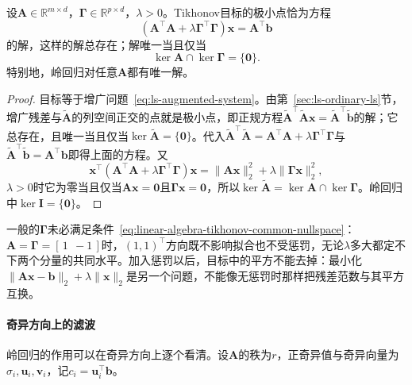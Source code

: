 \begin{theorem}[Tikhonov解的存在与唯一]
\label{thm:ls-tikhonov-existence-uniqueness}
设$\bm A\in\mathbb R^{m\times d}$，$\bm\Gamma\in\mathbb R^{p\times d}$，$\lambda>0$。Tikhonov目标的极小点恰为方程
\[
 (\bm A^\top\bm A+\lambda\bm\Gamma^\top\bm\Gamma)\bm x=\bm A^\top\bm b
\]
的解，这样的解总存在；解唯一当且仅当
\begin{equation}
 \ker\bm A\cap\ker\bm\Gamma=\{\bm0\}.
 \label{eq:linear-algebra-tikhonov-common-nullspace}
\end{equation}
特别地，岭回归对任意$\bm A$都有唯一解。
\end{theorem}
\begin{proof}
目标等于增广问题~\eqref{eq:ls-augmented-system}。由第~\ref{sec:ls-ordinary-ls}节，增广残差与$\tilde{\bm A}$的列空间正交的点就是极小点，即正规方程$\tilde{\bm A}^\top\tilde{\bm A}\bm x=\tilde{\bm A}^\top\tilde{\bm b}$的解；它总存在，且唯一当且仅当$\ker\tilde{\bm A}=\{\bm0\}$。代入$\tilde{\bm A}^\top\tilde{\bm A}=\bm A^\top\bm A+\lambda\bm\Gamma^\top\bm\Gamma$与$\tilde{\bm A}^\top\tilde{\bm b}=\bm A^\top\bm b$即得上面的方程。又
\[
\bm x^\top(\bm A^\top\bm A+\lambda\bm\Gamma^\top\bm\Gamma)\bm x=\lVert\bm A\bm x\rVert_2^2+\lambda\lVert\bm\Gamma\bm x\rVert_2^2 ,
\]
$\lambda>0$时它为零当且仅当$\bm A\bm x=\bm0$且$\bm\Gamma\bm x=\bm0$，所以$\ker\tilde{\bm A}=\ker\bm A\cap\ker\bm\Gamma$。岭回归中$\ker\bm I=\{\bm0\}$。
\end{proof}

一般的$\bm\Gamma$未必满足条件~\eqref{eq:linear-algebra-tikhonov-common-nullspace}：$\bm A=\bm\Gamma=[\,1\ \ -1\,]$时，$(1,1)^\top$方向既不影响拟合也不受惩罚，无论$\lambda$多大都定不下两个分量的共同水平。加入惩罚以后，目标中的平方不能去掉：最小化$\lVert\bm A\bm x-\bm b\rVert_2+\lambda\lVert\bm x\rVert_2$是另一个问题，不能像无惩罚时那样把残差范数与其平方互换。

\paragraph{奇异方向上的滤波}
岭回归的作用可以在奇异方向上逐个看清。设$\bm A$的秩为$r$，正奇异值与奇异向量为$\sigma_i,\bm u_i,\bm v_i$，记$c_i=\bm u_i^\top\bm b$。

